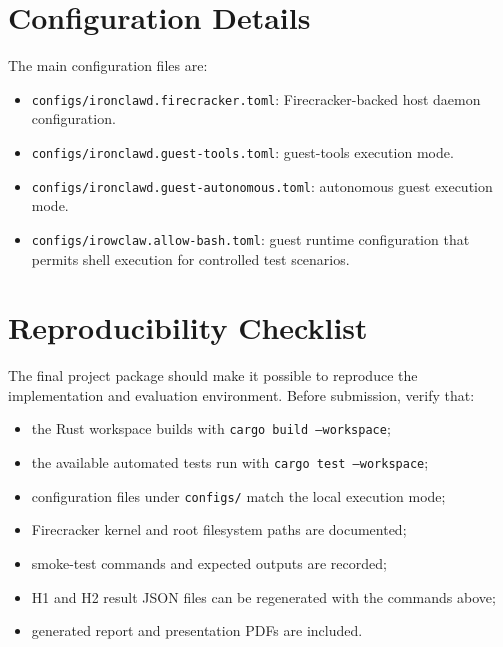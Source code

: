 \section{Configuration Details}
The main configuration files are:
\begin{itemize}
    \item \texttt{configs/ironclawd.firecracker.toml}: Firecracker-backed host
    daemon configuration.
    \item \texttt{configs/ironclawd.guest-tools.toml}: guest-tools execution
    mode.
    \item \texttt{configs/ironclawd.guest-autonomous.toml}: autonomous guest
    execution mode.
    \item \texttt{configs/irowclaw.allow-bash.toml}: guest runtime configuration
    that permits shell execution for controlled test scenarios.
\end{itemize}

\section{Reproducibility Checklist}
The final project package should make it possible to reproduce the implementation
and evaluation environment. Before submission, verify that:
\begin{itemize}
    \item the Rust workspace builds with \texttt{cargo build --workspace};
    \item the available automated tests run with \texttt{cargo test --workspace};
    \item configuration files under \texttt{configs/} match the local execution
    mode;
    \item Firecracker kernel and root filesystem paths are documented;
    \item smoke-test commands and expected outputs are recorded;
    \item H1 and H2 result JSON files can be regenerated with the commands above;
    \item generated report and presentation PDFs are included.
\end{itemize}

